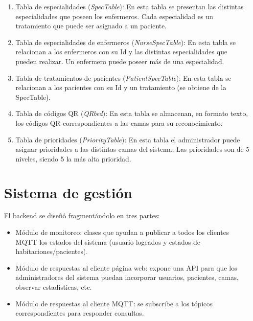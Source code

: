\begin{enumerate}
\item Tabla de especialidades (\textit{SpecTable}): En esta tabla se presentan las distintas especialidades que poseen los enfermeros. Cada especialidad es un tratamiento que puede ser asignado a un paciente.

\item Tabla de especialidades de enfermeros (\textit{NurseSpecTable}): En esta tabla se relacionan a los enfermeros con su Id y las distintas especialidades que pueden realizar. Un enfermero puede poseer más de una especialidad.

\item Tabla de tratamientos de pacientes (\textit{PatientSpecTable}): En esta tabla se relacionan a los pacientes con su Id y un tratamiento (se obtiene de la SpecTable). 

\item Tabla de códigos QR (\textit{QRbed}): En esta tabla se almacenan, en formato texto, los códigos QR correspondientes a las camas para su reconocimiento.

\item Tabla de prioridades (\textit{PriorityTable}): En esta tabla el administrador puede asignar prioridades a las distintas camas del sistema.  Las prioridades son de 5 niveles, siendo 5 la más alta prioridad.



\end{enumerate}



\section{Sistema de gestión}

El backend se diseñó fragmentándolo en tres partes:

\begin{itemize}
\item Módulo de monitoreo: clases que ayudan a publicar a todos los clientes MQTT los estados del sistema (usuario logeados y estados de habitaciones/pacientes). 
\item Módulo de respuestas al cliente página web: expone una API para que los administradores del sistema puedan incorporar usuarios, pacientes, camas, observar estadísticas, etc.
\item Módulo de respuestas al cliente MQTT: se subscribe a los tópicos correspondientes para responder consultas.
\end{itemize}

